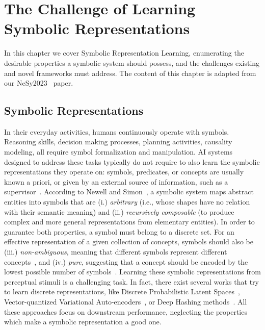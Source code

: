 \chapter{The Challenge of Learning Symbolic Representations}
\label{chap:chalsymb}

In this chapter we cover Symbolic Representation Learning, enumerating the desirable properties a symbolic system should possess, and the challenges existing and novel frameworks must address. The content of this chapter is adapted from our NeSy2023~\cite{lorello2023challenge} paper.


\section{Symbolic Representations}
In their everyday activities, humans continuously operate with symbols. Reasoning skills, decision making processes, planning activities, causality modeling, all require symbol formalization and manipulation. AI systems designed to address these tasks typically do not require to also learn the symbolic representations they operate on: symbols, predicates, or concepts are usually known a priori, or given by an external source of information, such as a supervisor~\cite{ciravegna2023logic}.
%
%
%
%
According to Newell and Simon~\cite{newell1972human}, a symbolic system maps abstract entities into symbols that are (i.) \textit{arbitrary} (i.e., whose shapes have no relation with their semantic meaning) and (ii.) \textit{recursively composable} (to produce complex and more general representations from elementary entities). In order to guarantee both properties, a symbol must belong to a discrete set.
%
For an effective representation of a given collection of concepts,  symbols should also be (iii.) \textit{non-ambiguous}, meaning that different symbols represent different concepts~\cite{asai2018classical}, and (iv.) \textit{pure}, suggesting that a concept should be encoded by the lowest possible number of symbols~\cite{chen2020concept}.
%
Learning these symbolic representations from perceptual stimuli is a challenging task. In fact, there exist several works that try to learn discrete representations, like Discrete Probabilistic Latent Spaces~\cite{asai2018classical}, Vector-quantized Variational Auto-encoders~\cite{van2017neural}, or Deep Hashing methods~\cite{luo2020survey}. All these approaches focus on downstream performance, neglecting the properties which make a symbolic representation a good one.
